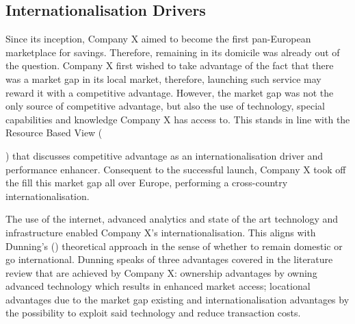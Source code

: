 \documentclass[11pt,a4paper]{article}
\begin{document}
{{\subsection{Internationalisation Drivers}
\vspace{-1mm}
\label{entry_motives}
 \par
Since its inception, Company X aimed to become the first pan-European marketplace for savings. Therefore, remaining in its domicile was already out of the question. Company X first wished to take advantage of the fact that there was a market gap in its local market, therefore, launching such service may reward it with a competitive advantage. However, the market gap was not the only source of competitive advantage, but also the use of technology, special capabilities and knowledge Company X has access to. This stands in line with the Resource Based View ({\cite{barneyResourcebasedViewFirm2001}) that discusses competitive advantage as an internationalisation driver and performance enhancer. Consequent to the successful launch, Company X took off the fill this market gap all over Europe, performing a cross-country internationalisation. \par
The use of the internet, advanced analytics and state of the art technology and infrastructure enabled Company X's internationalisation. This aligns with Dunning's (\citeyear{dunningEclecticTheoryInternational1980}) theoretical approach in the sense of whether to remain domestic or go international. Dunning speaks of three advantages covered in the literature review that are achieved by Company X: ownership advantages by owning advanced technology which results in enhanced market access; locational advantages due to the market gap existing and internationalisation advantages by the possibility to exploit said technology and reduce transaction costs.  \par

}}}
\end{document}
